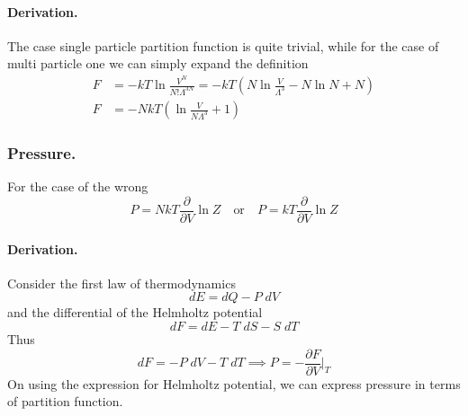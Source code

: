\documentclass[../../../Main.tex]{subfiles}
\begin{document}
\paragraph{Derivation.} The case single particle partition function is quite trivial, while for the case of multi particle one we can simply expand the definition
\begin{align*}
    F&=-kT\ln \frac{V^N}{N!\Lambda^{3N}}=-kT\left(N\ln\frac{V}{\Lambda^3}-N\ln N+N\right)\\
    F&=-NkT\left(\ln \frac{V}{N\Lambda^3}+1\right)
\end{align*}

\subsubsection*{Pressure.} For the case of the wrong 
\begin{equation*}
    P=NkT\frac{\partial}{\partial V} \ln Z\quad\text{or}\quad P=kT\frac{\partial}{\partial V} \ln Z
\end{equation*}

\paragraph{Derivation.} Consider the first law of thermodynamics
\begin{equation*} 
    dE=dQ-P\;dV
\end{equation*}
and the differential of the Helmholtz potential 
\begin{equation*}
    dF=dE-T\;dS-S\;dT
\end{equation*}
Thus 
\begin{equation*}
    dF=-P\;dV-T\;dT\implies P=-\frac{\partial F}{\partial V}\bigg|_{T}
\end{equation*}
On using the expression for Helmholtz potential, we can express pressure in terms of partition function.

\end{document}
